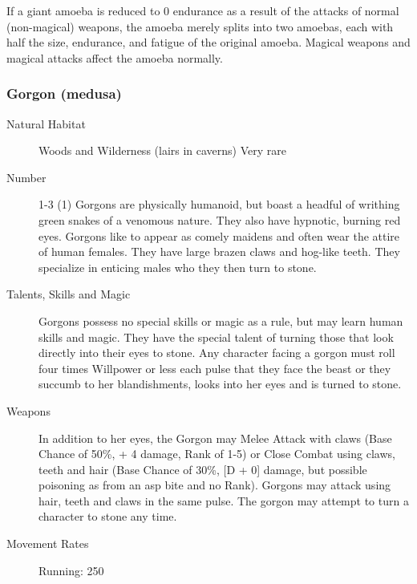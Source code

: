 \begin{multicols}{2}
\begin{description}
\setlength\itemsep{0pt}

\item[Comments] If a giant amoeba is reduced to 0 endurance as a result of
the attacks of normal (non-magical) weapons, the amoeba merely splits
into two amoebas, each with half the size, endurance, and fatigue of
the original amoeba. Magical weapons and magical attacks affect the
amoeba normally.

\end{description}

\subsubsection{Gorgon (medusa)}

\begin{description}
\item[Natural Habitat] Woods and Wilderness (lairs in caverns) Very rare 

\item[Number]  1-3 (1)
 Gorgons are physically humanoid, but boast a headful of
writhing green snakes of a venomous nature. They also have hypnotic,
burning red eyes. Gorgons like to appear as comely maidens and often
wear the attire of human females.  They have large brazen claws and
hog-like teeth. They specialize in enticing males who they then turn
to stone.

\item[Talents, Skills and Magic] Gorgons possess no special skills or magic as a rule, but
may learn human skills and magic. They have the special talent of
turning those that look directly into their eyes to stone. Any
character facing a gorgon must roll four times Willpower or less each
pulse that they face the beast or they succumb to her blandishments,
looks into her eyes and is turned to stone.

\item[Weapons] In addition to her eyes, the Gorgon may Melee Attack with
claws (Base Chance of 50\%, + 4 damage, Rank of 1-5) or Close Combat
using claws, teeth and hair (Base Chance of 30\%, [D + 0] damage, but
possible poisoning as from an asp bite and no Rank). Gorgons may
attack using hair, teeth and claws in the same pulse. The gorgon may
attempt to turn a character to stone any time.


\item[Movement Rates] Running: 250


\end{description}
\end{multicols}
